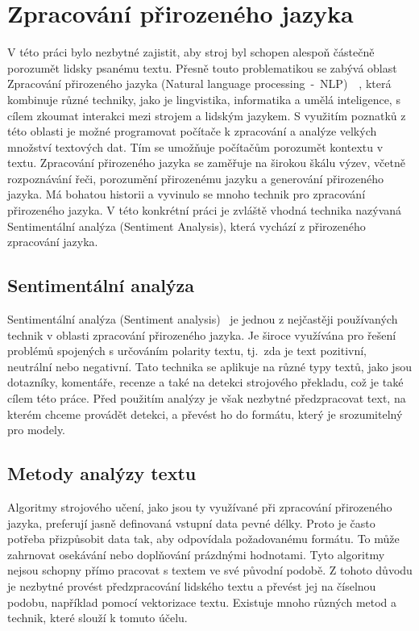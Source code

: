 \chapter{Zpracování přirozeného jazyka}
V této práci bylo nezbytné zajistit, aby stroj byl schopen alespoň částečně porozumět lidsky psanému textu.
Přesně touto problematikou se zabývá oblast Zpracování přirozeného jazyka (Natural language processing~-~NLP)~\cite{link8}~\cite{link9},
 která kombinuje různé techniky, jako je lingvistika, informatika a umělá inteligence, s cílem zkoumat interakci mezi strojem a lidským jazykem.
S využitím poznatků z této oblasti je možné programovat počítače k zpracování a analýze velkých množství textových dat.
Tím se umožňuje počítačům porozumět kontextu v textu.
Zpracování přirozeného jazyka se zaměřuje na širokou škálu výzev, včetně rozpoznávání řeči, porozumění přirozenému jazyku a generování přirozeného jazyka.
Má bohatou historii a vyvinulo se mnoho technik pro zpracování přirozeného jazyka.
V této konkrétní práci je zvláště vhodná technika nazývaná Sentimentální analýza (Sentiment Analysis), která vychází z přirozeného zpracování jazyka.\@

\section{Sentimentální analýza}
Sentimentální analýza (Sentiment analysis)~\cite{link10} je jednou z nejčastěji používaných technik v oblasti zpracování přirozeného jazyka.\@
Je široce využívána pro řešení problémů spojených s určováním polarity textu, tj.\ zda je text pozitivní, neutrální nebo negativní.
Tato technika se aplikuje na různé typy textů, jako jsou dotazníky, komentáře, recenze a také na detekci strojového překladu, což je také cílem této práce.
Před použitím analýzy je však nezbytné předzpracovat text, na kterém chceme provádět detekci, a převést ho do formátu, který je srozumitelný pro modely.

\section{Metody analýzy textu}
Algoritmy strojového učení, jako jsou ty využívané při zpracování přirozeného jazyka, preferují jasně definovaná vstupní data pevné délky.
Proto je často potřeba přizpůsobit data tak, aby odpovídala požadovanému formátu.
To může zahrnovat osekávání nebo doplňování prázdnými hodnotami.
Tyto algoritmy nejsou schopny přímo pracovat s textem ve své původní podobě.
Z tohoto důvodu je nezbytné provést předzpracování lidského textu a převést jej na číselnou podobu, například pomocí vektorizace textu.
Existuje mnoho různých metod a technik, které slouží k tomuto účelu.

